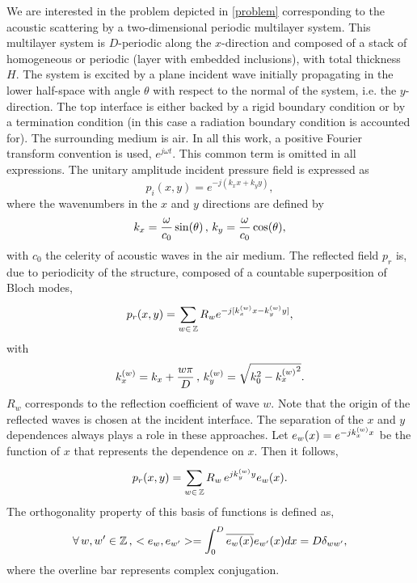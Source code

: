 We are interested in the problem depicted in \cref{problem} corresponding to the acoustic scattering by a two-dimensional periodic multilayer system. This multilayer system is $D$-periodic along the $x$-direction and composed of a stack of homogeneous or periodic (layer with embedded inclusions), with total thickness $H$. The system is excited by a plane incident wave initially propagating in the lower half-space with angle $\theta$ with respect to the normal of the system, i.e. the $y$-direction. The top interface is either backed by a rigid boundary condition or by a termination condition (in this case a radiation boundary condition is accounted for). The surrounding medium is air. In all this work, a positive Fourier transform convention is used, $e^{j\omega t}$. This common term is omitted in all expressions. The unitary amplitude incident pressure field is expressed as
\begin{equation}
  p_i(x,y) = e^{-j(k_x x+k_y y)},
\end{equation}
where the wavenumbers in the $x$ and $y$ directions are defined by 
\begin{equation}
 k_x=\dfrac{\omega}{c_0}\sin(\theta) \, , \, k_y=\dfrac{\omega}{c_0}\cos(\theta), 
\end{equation}
with $c_0$ the celerity of acoustic waves in the air medium. The reflected field $p_r$ is, due to periodicity of the structure, composed of a countable superposition of Bloch modes,
\begin{equation}\label{eq:p_r as R}
  p_r(x,y) = \displaystyle{\sum_{w\in \, \mathbb{Z}}^{}}\,  R_w e^{-j[k_x^{(w)} x-k_y^{(w)} y]},
\end{equation}
with
\begin{equation}
  k_x^{(w)}=  k_x+ \dfrac{w\pi}{D} \, , \, k_y^{(w)}= \sqrt{k_0^2-{k_x^{(w)}}^2}.
\end{equation}
$R_w$ corresponds to the reflection coefficient of wave $w$. Note that the origin of the reflected waves is chosen at the incident interface. The separation of the $x$ and $y$ dependences always plays a role in these approaches. Let ${e}_{w}(x)=e^{-jk_x^{(w)} x} $ be the function of $x$ that represents the dependence on $x$. Then it follows,
\begin{equation}\label{eq:definition_ew}
  p_r(x,y) = \displaystyle{\sum_{w\in \, \mathbb{Z}}^{}}\,  R_w \, e^{jk_y^{(w)}y} {e}_{w} (x).
\end{equation}
The orthogonality property of this basis of functions is defined as, 
\begin{equation}\label{eq:orthogonality_ew}
  \forall\, w, w'\in \mathbb{Z} \, , \, <{e}_{w},e_{w'}> = \int_0^D \overline{{e}_{w}(x)}e_{w'}(x)dx 
  =  D\delta_{ww'},
\end{equation}
where the overline bar represents complex conjugation.\\

